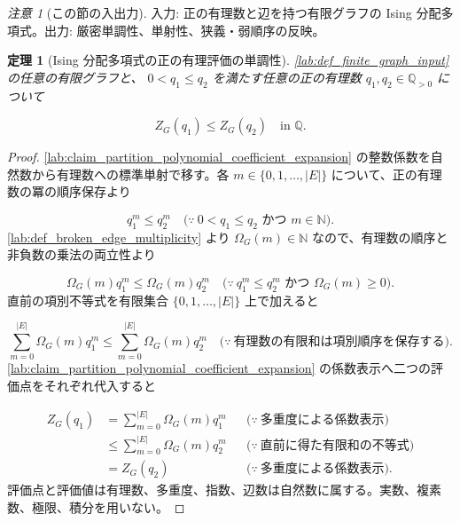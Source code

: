 \documentclass[11pt,a4paper]{article}
\newtheorem{theorem}[definition]{定理}
\theoremstyle{remark}
\newtheorem{remark}[definition]{注意}
\begin{document}
\begin{remark}[この節の入出力]
入力: 正の有理数と辺を持つ有限グラフの Ising 分配多項式。出力: 厳密単調性、単射性、狭義・弱順序の反映。

\end{remark}

\begin{theorem}[Ising 分配多項式の正の有理評価の単調性]\label{lab:theorem_partition_polynomial_positive_rational_evaluation_monotonicity}
\cref{lab:def_finite_graph_input}
 の任意の有限グラフと、
$0<q_1\le q_2$
 を満たす任意の正の有理数 
$q_1,q_2\in\mathbb Q_{>0}$
 について

\[Z_G(q_1)\le Z_G(q_2)\quad\text{in }\mathbb Q.\]
\end{theorem}
\begin{proof}
\cref{lab:claim_partition_polynomial_coefficient_expansion}
 の整数係数を自然数から有理数への標準単射で移す。各 
$m\in\{0,1,\ldots,|E|\}$
 について、正の有理数の冪の順序保存より

\[q_1^m\le q_2^m
\quad\bigl(\because\ 0<q_1\le q_2\text{ かつ }m\in\mathbb N\bigr).\]
\cref{lab:def_broken_edge_multiplicity}
 より 
$\Omega_G(m)\in\mathbb N$
 なので、有理数の順序と非負数の乗法の両立性より

\[\Omega_G(m)q_1^m\le\Omega_G(m)q_2^m
\quad\bigl(\because\ q_1^m\le q_2^m\text{ かつ }\Omega_G(m)\ge0\bigr).\]
直前の項別不等式を有限集合 
$\{0,1,\ldots,|E|\}$
 上で加えると

\[\sum_{m=0}^{|E|}\Omega_G(m)q_1^m
\le
\sum_{m=0}^{|E|}\Omega_G(m)q_2^m
\quad\bigl(\because\ \text{有理数の有限和は項別順序を保存する}\bigr).\]
\cref{lab:claim_partition_polynomial_coefficient_expansion}
 の係数表示へ二つの評価点をそれぞれ代入すると

\[\begin{aligned}
Z_G(q_1)
&=\sum_{m=0}^{|E|}\Omega_G(m)q_1^m
&&\bigl(\because\ \text{多重度による係数表示}\bigr)\\
&\le\sum_{m=0}^{|E|}\Omega_G(m)q_2^m
&&\bigl(\because\ \text{直前に得た有限和の不等式}\bigr)\\
&=Z_G(q_2)
&&\bigl(\because\ \text{多重度による係数表示}\bigr).
\end{aligned}\]
評価点と評価値は有理数、多重度、指数、辺数は自然数に属する。実数、複素数、極限、積分を用いない。

\end{proof}
\end{document}
